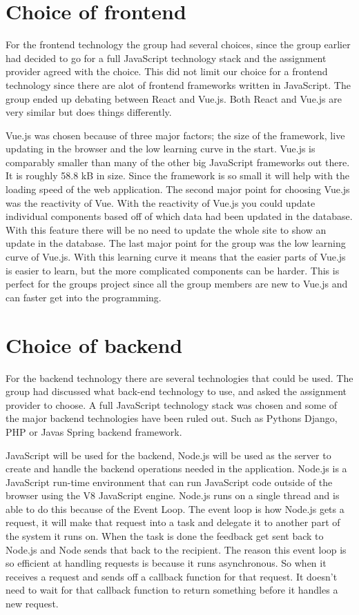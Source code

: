 \section{Choice of frontend} 
For the frontend technology the group had several choices, since the group earlier had decided to go for a full JavaScript technology stack and the assignment provider agreed with the choice. This did not limit our choice for a frontend technology since there are alot of frontend frameworks written in JavaScript. The group ended up debating between React and Vue.js. Both React and Vue.js are very similar but does things differently. 

 Vue.js was chosen because of three major factors; the size of the framework, live updating in the browser and the low learning curve in the start. Vue.js is comparably smaller than many of the other big JavaScript frameworks out there. It is roughly 58.8 kB in size. Since the framework is so small it will help with the loading speed of the web application. The second major point for choosing Vue.js was the reactivity of Vue. With the reactivity of Vue.js you could update individual components based off of which data had been updated in the database. With this feature there will be no need to update the whole site to show an update in the database. The last major point for the group was the low learning curve of Vue.js. With this learning curve it means that the easier parts of Vue.js is easier to learn, but the more complicated components can be harder. This is perfect for the groups project since all the group members are new to Vue.js and can faster get into the programming.

\section{Choice of backend}
For the backend technology there are several technologies that could be used. The group had discussed what back-end technology to use, and asked the assignment provider to choose. A full JavaScript technology stack was chosen and some of the major backend technologies have been ruled out. Such as Pythons Django, PHP or Javas Spring backend framework. 

JavaScript will be used for the backend, Node.js will be used as the server to create and handle the backend operations needed in the application. Node.js is a JavaScript run-time environment that can run JavaScript code outside of the browser using the V8 JavaScript engine. Node.js runs on a single thread and is able to do this because of the Event Loop. The event loop is how Node.js gets a request, it will make that request into a task and delegate it to another part of the system it runs on. When the task is done the feedback get sent back to Node.js and Node sends that back to the recipient. The reason this event loop is so efficient at handling requests is because it runs asynchronous. So when it receives a request and sends off a callback function for that request. It doesn't need to wait for that callback function to return something before it handles a new request.

